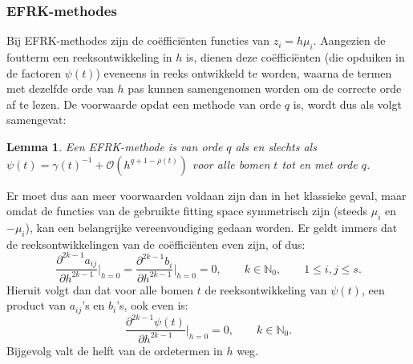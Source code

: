\documentclass[12pt]{article}
\newtheorem{lem}[defn]{Lemma}
\begin{document}
\subsubsection{EFRK-methodes}
Bij EFRK-methodes zijn de coëfficiënten functies van \(z_i=h\mu_i\). Aangezien de foutterm een reeksontwikkeling in \(h\) is, dienen deze coëfficiënten (die opduiken in de factoren \(\psi(t)\)) eveneens in reeks ontwikkeld te worden, waarna de termen met dezelfde orde van \(h\) pas kunnen samengenomen worden om de correcte orde af te lezen. De voorwaarde opdat een methode van orde \(q\) is, wordt dus als volgt samengevat:
\begin{lem} \label{lem:orderv1}
Een EFRK-methode is van orde \(q\) als en slechts als \(\psi(t)=\gamma(t)^{-1}+\mathcal{O}(h^{q+1-\rho(t)})\) voor alle bomen \(t\) tot en met orde \(q\).
\end{lem}
Er moet dus aan meer voorwaarden voldaan zijn dan in het klassieke geval, maar omdat de functies van de gebruikte fitting space symmetrisch zijn (steeds \(\mu_i\) en \(-\mu_i\)), kan een belangrijke vereenvoudiging gedaan worden. Er geldt immers dat de reeksontwikkelingen van de coëfficiënten even zijn, of dus:
\[\frac{\partial^{2k-1} a_{ij}}{\partial h^{2k-1}}\Biggr|_{h=0}=\frac{\partial^{2k-1} b_{i}}{\partial h^{2k-1}}\Biggr|_{h=0}=0,\qquad k\in\mathbb{N}_0,\qquad1\le i,j\le s.\]
Hieruit volgt dan dat voor alle bomen \(t\) de reeksontwikkeling van \(\psi(t)\), een product van \(a_{ij}\)'s en \(b_i\)'s, ook even is:
\[\frac{\partial^{2k-1} \psi(t)}{\partial h^{2k-1}}\Biggr|_{h=0}=0,\qquad k\in\mathbb{N}_0.\]
Bijgevolg valt de helft van de ordetermen in \(h\) weg.
\end{document}
